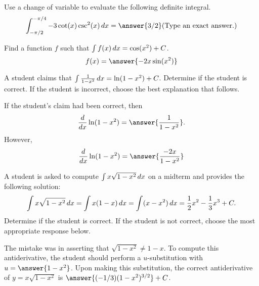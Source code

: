 \documentclass{ximera}
\begin{document}
\begin{problem}
  Use a change of variable to evaluate the following definite integral.
  \[
    \int_{-\pi/2}^{-\pi/4} -3 \cot(x) \csc^2(x) \d x = \answer{3/2} \text{(Type an exact answer.)}
  \]
\end{problem}

\begin{problem}
  Find a function $f$ such that $\int f(x) \mathop{}\!d x = \cos(x^2) + C$.
  \[
  f(x) = \answer{-2 x \sin(x^2)}
  \]
\end{problem}

\begin{problem}
  A student claims that $\int \frac{1}{1-x^2} \mathop{}\!d x = \ln(1 - x^2) + C$.
  Determine if the student is correct.
  If the student is incorrect, choose the best explanation that follows.
  \begin{multipleChoice}
  \end{multipleChoice}
  \begin{problem}
    If the student's claim had been correct, then
    \[
    \dd{x} \ln(1 - x^2) = \answer{\frac{1}{1-x^2}}.
    \]
    However,
    \[
    \dd{x} \ln(1 - x^2) = \answer{\frac{-2x}{1 - x^2}}
    \]
  \end{problem}
\end{problem}


\begin{problem}
  A student is asked to compute $\int x \sqrt{1 - x^2} \mathop{}\!d x$ on a midterm and provides the following solution:
  \[
    \int x \sqrt{1 - x^2} \mathop{}\!d x= \int x(1 -x) \mathop{}\!d x = \int (x - x^2 )\mathop{}\!d x = \frac{1}{2}x^2 - \frac{1}{3}x^3 + C.
  \]
  Determine if the student is correct.
  If the student is not correct, choose the most appropriate response below.
  \begin{multipleChoice}
  \end{multipleChoice}
  \begin{problem}
    The mistake was in asserting that $\sqrt{1 - x^2} \ne 1 - x$.  To
    compute this antiderivative, the student should perform a
    $u$-substitution with $u = \answer{1 - x^2}$.  Upon making this
    substitution, the correct antiderivative of $y = x \sqrt{1 - x^2}$
    is $\answer{(-1/3)(1 - x^2)^{3/2}} + C$.
  \end{problem}
\end{problem}
\end{document}
